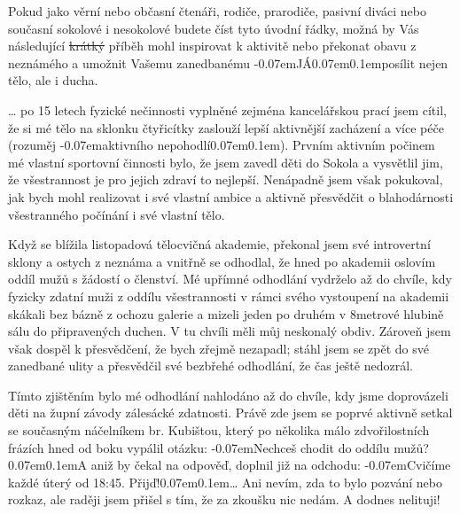 \documentclass[11pt]{article}
\newcommand{\luv}{\clqq\kern-0.07em}
\newcommand{\ruv}{\kern0.07em\crqq\kern0.1em}
\begin{document}
Pokud jako věrní nebo občasní čtenáři, rodiče, prarodiče, pasivní diváci nebo současní sokolové i nesokolové budete číst tyto úvodní řádky, možná by Vás následující \sout{krátký} příběh mohl inspirovat k aktivitě nebo překonat obavu z neznámého a umožnit Vašemu zanedbanému \luv JÁ\ruv  posílit nejen tělo, ale i ducha.

\ldots{} po 15 letech fyzické nečinnosti vyplněné zejména kancelářskou prací jsem cítil, že si mé tělo na sklonku čtyřicítky zaslouží lepší aktivnější zacházení a více péče (rozuměj \luv aktivního nepohodlí\ruv). Prvním aktivním počinem mé vlastní sportovní činnosti bylo, že jsem zavedl děti do Sokola a vysvětlil jim, že všestrannost je pro jejich zdraví to nejlepší. Nenápadně jsem však pokukoval, jak bych mohl realizovat i své vlastní ambice a aktivně přesvědčit o blahodárnosti všestranného počínání i své vlastní tělo.

Když se blížila listopadová tělocvičná akademie, překonal jsem své introvertní sklony a ostych z neznáma a vnitřně se odhodlal, že hned po akademii oslovím oddíl mužů s žádostí o členství. Mé upřímné odhodlání vydrželo až do chvíle, kdy fyzicky zdatní muži z oddílu všestrannosti v rámci svého vystoupení na akademii skákali bez bázně z ochozu galerie a mizeli jeden po druhém v 8metrové hlubině sálu do připravených duchen. V tu chvíli měli můj neskonalý obdiv. Zároveň jsem však dospěl k přesvědčení, že bych zřejmě nezapadl; stáhl jsem se zpět do své zanedbané ulity a přesvědčil své bezbřehé odhodlání, že čas ještě nedozrál.

Tímto zjištěním bylo mé odhodlání nahlodáno až do chvíle, kdy jsme doprovázeli děti na župní závody zálesácké zdatnosti. Právě zde jsem se poprvé aktivně setkal se současným náčelníkem br. Kubištou, který po několika málo zdvořilostních frázích hned od boku vypálil otázku: \luv Nechceš chodit do oddílu mužů?\ruv A aniž by čekal na odpověď, doplnil již na odchodu: \luv Cvičíme každé úterý od 18:45. Přijď!\ruv \ldots{} Ani nevím, zda to bylo pozvání nebo rozkaz, ale raději jsem přišel s tím, že za zkoušku nic nedám. A dodnes nelituji!
\end{document}
